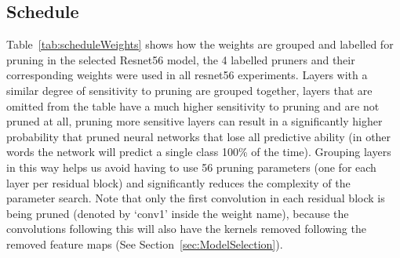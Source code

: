 \documentclass[../Dissertation.tex]{subfiles}
\begin{document}
\newpage
\subsection{Schedule}
Table~\ref{tab:scheduleWeights} shows how the weights are grouped and labelled for pruning in the selected Resnet56 model, the 4 labelled pruners and their corresponding weights were used in all resnet56 experiments.
Layers with a similar degree of sensitivity to pruning are grouped together, layers that are omitted from the table have a much higher sensitivity to pruning and are not pruned at all, pruning more sensitive layers can result in a significantly higher probability that pruned neural networks that lose all predictive ability (in other words the network will predict a single class 100\% of the time).
Grouping layers in this way helps us avoid having to use 56 pruning parameters (one for each layer per residual block) and significantly reduces the complexity of the parameter search.
Note that only the first convolution in each residual block is being pruned (denoted by `conv1' inside the weight name), because the convolutions following this will also have the kernels removed following the removed feature maps (See Section~\ref{sec:ModelSelection}).
\end{document}
